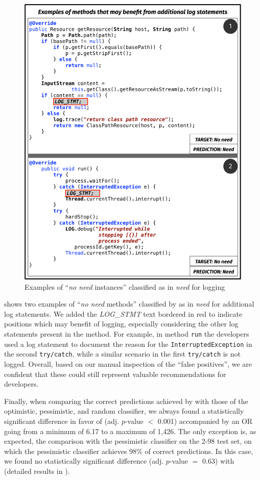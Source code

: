 \begin{figure}[h!]
	\centering
	\includegraphics[width=0.85\columnwidth]{img/2-98-examples.pdf}
	\vspace{-0.2cm}
	\caption{Examples of ``\emph{no need} instances'' classified as in \emph{need} for logging}
	\label{fig:no-need}
	\vspace{-0.3cm}
\end{figure}

 shows two examples of ``\emph{no need} methods'' classified by \approach as in \emph{need} for additional log statements. We added the \emph{LOG\_STMT} text bordered in red to indicate positions which may benefit of logging, especially considering the other log statements present in the method. For example, in method \texttt{run}  the developers used a log statement to document the reason for the \texttt{InterruptedException} in the second \texttt{try/catch}, while a similar scenario in the first \texttt{try/catch} is not logged. Overall, based on our manual inspection of the ``false positives'', we are confident that these could still represent valuable recommendations for developers.

Finally, when comparing the correct predictions achieved by \approach with those of the optimistic, pessimistic, and random classifier, we always found a statistically significant difference in favor of \approach (adj. $p$-value $<$ 0.001) accompanied by an OR going from a minimum of 6.17 to a maximum of 1,426. The only exception is, as expected, the comparison with the pessimistic classifier on the 2-98 test set, on which the pessimistic classifier achieves 98\% of correct predictions. In this case, we found no statistically significant difference (adj. $p$-value $=$ 0.63) with \approach (detailed results in \cite{replication}).

